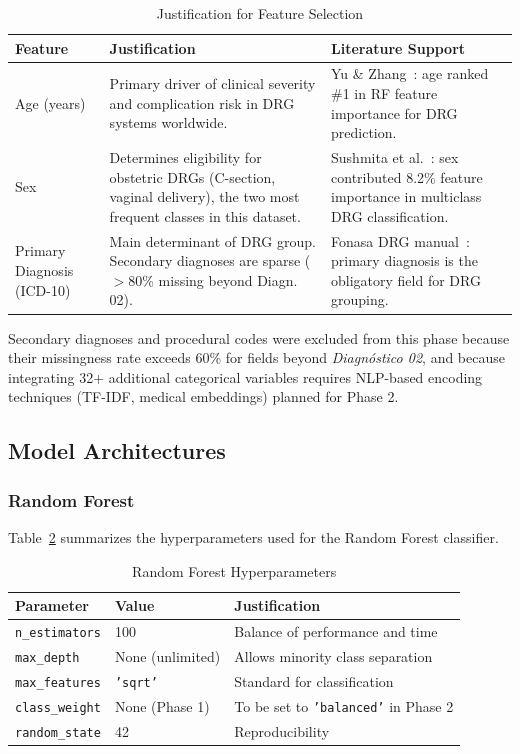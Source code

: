 \documentclass{IEEEtran}
\begin{document}
\begin{table}[htbp]
\caption{Justification for Feature Selection}
\label{tab:features}
\centering
\renewcommand{\arraystretch}{1.3}
\begin{tabular}{p{1.5cm}p{3.0cm}p{3.0cm}}
\toprule
\textbf{Feature} & \textbf{Justification} & \textbf{Literature Support} \\
\midrule
Age (years) &
Primary driver of clinical severity and complication risk in DRG systems worldwide. &
Yu \& Zhang~\cite{yu2022}: age ranked \#1 in RF feature importance for DRG prediction. \\
\midrule
Sex &
Determines eligibility for obstetric DRGs (C-section, vaginal delivery), the two most frequent classes in this dataset. &
Sushmita et al.~\cite{sushmita2021}: sex contributed 8.2\% feature importance in multiclass DRG classification. \\
\midrule
Primary Diagnosis (ICD-10) &
Main determinant of DRG group. Secondary diagnoses are sparse ($>$80\% missing beyond Diagn. 02). &
Fonasa DRG manual~\cite{minsal2023}: primary diagnosis is the obligatory field for DRG grouping. \\
\bottomrule
\end{tabular}
\end{table}

Secondary diagnoses and procedural codes were excluded from this phase because their missingness rate exceeds 60\% for fields beyond \textit{Diagn\'ostico 02}, and because integrating 32+ additional categorical variables requires NLP-based encoding techniques (TF-IDF, medical embeddings) planned for Phase 2.

\subsection{Model Architectures}

\subsubsection{Random Forest}
Table~\ref{tab:rf} summarizes the hyperparameters used for the Random Forest classifier.

\begin{table}[htbp]
\caption{Random Forest Hyperparameters}
\label{tab:rf}
\centering
\begin{tabular}{llp{3.2cm}}
\toprule
\textbf{Parameter} & \textbf{Value} & \textbf{Justification} \\
\midrule
\texttt{n\_estimators}   & 100              & Balance of performance and time \\
\texttt{max\_depth}      & None (unlimited) & Allows minority class separation \\
\texttt{max\_features}   & \texttt{'sqrt'}  & Standard for classification~\cite{breiman2001} \\
\texttt{class\_weight}   & None (Phase 1)   & To be set to \texttt{'balanced'} in Phase 2 \\
\texttt{random\_state}   & 42               & Reproducibility \\
\bottomrule
\end{tabular}
\end{table}
\end{document}
